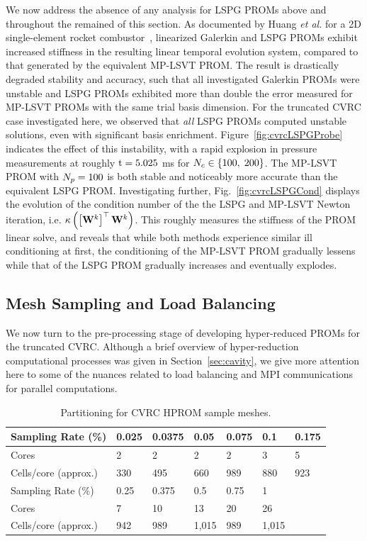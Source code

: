 We now address the absence of any analysis for LSPG PROMs above and throughout the remained of this section. As documented by Huang \textit{et al.} for a 2D single-element rocket combustor~\cite{Huang2022}, linearized Galerkin and LSPG PROMs exhibit increased stiffness in the resulting linear temporal evolution system, compared to that generated by the equivalent MP-LSVT PROM. The result is drastically degraded stability and accuracy, such that all investigated Galerkin PROMs were unstable and LSPG PROMs exhibited more than double the error measured for MP-LSVT PROMs with the same trial basis dimension. For the truncated CVRC case investigated here, we observed that \textit{all} LSPG PROMs computed unstable solutions, even with significant basis enrichment. Figure~\ref{fig:cvrcLSPGProbe} indicates the effect of this instability, with a rapid explosion in pressure measurements at roughly $\text{t} = 5.025$ ms for $N_c \in \{100, \; 200\}$. The MP-LSVT PROM with $N_p = 100$ is both stable and noticeably more accurate than the equivalent LSPG PROM. Investigating further, Fig.~\ref{fig:cvrcLSPGCond} displays the evolution of the condition number of the the LSPG and MP-LSVT Newton iteration, i.e. $\kappa \left(\left[\testBasis^{\newtonIdx}\right]^\top \testBasis^{\newtonIdx}\right)$. This roughly measures the stiffness of the PROM linear solve, and reveals that while both methods experience similar ill conditioning at first, the conditioning of the MP-LSVT PROM gradually lessens while that of the LSPG PROM gradually increases and eventually explodes.

\subsection{Mesh Sampling and Load Balancing}

We now turn to the pre-processing stage of developing hyper-reduced PROMs for the truncated CVRC. Although a brief overview of hyper-reduction computational processes was given in Section~\ref{sec:cavity}, we give more attention here to some of the nuances related to load balancing and MPI communications for parallel computations.

\begin{table}
	\centering
	\begin{tabular}{ lllllll }
	\toprule
	Sampling Rate (\%) & 0.025 & 0.0375 & 0.05 & 0.075 & 0.1 & 0.175 \\
	\midrule
	Cores & 2 & 2 & 2 & 2 & 3 & 5 \\
	Cells/core (approx.) & 330 & 495 & 660 & 989 & 880 & 923 \\
	\bottomrule
	\toprule
	Sampling Rate (\%) & 0.25 & 0.375 & 0.5 & 0.75 & 1 &  \\
	\midrule
	Cores & 7 & 10 & 13 & 20 & 26 & \\
	Cells/core (approx.) & 942 & 989 & 1,015 & 989 & 1,015 & \\
	\bottomrule
	\end{tabular}
	\caption{\label{tab:cvrcSampProcs}Partitioning for CVRC HPROM sample meshes.}
\end{table}

